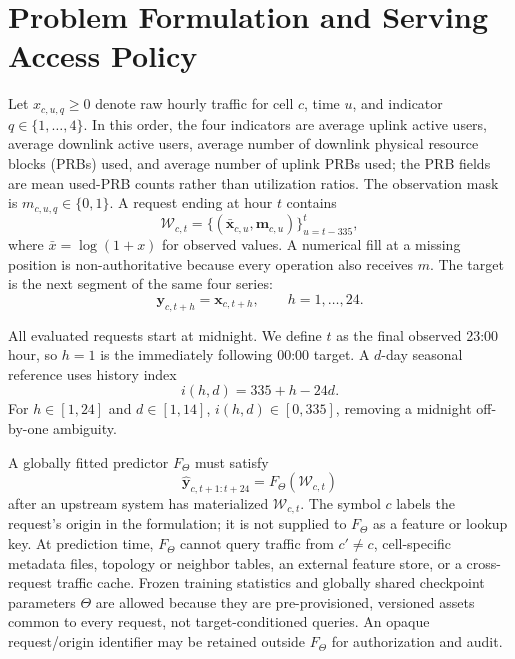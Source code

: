 \documentclass[10pt,conference,letterpaper]{IEEEtran}
\begin{document}
\section{Problem Formulation and Serving Access Policy}
Let $x_{c,u,q}\geq0$ denote raw hourly traffic for cell $c$, time $u$, and indicator $q\in\{1,\ldots,4\}$. In this order, the four indicators are average uplink active users, average downlink active users, average number of downlink physical resource blocks (PRBs) used, and average number of uplink PRBs used; the PRB fields are mean used-PRB counts rather than utilization ratios. The observation mask is $m_{c,u,q}\in\{0,1\}$. A request ending at hour $t$ contains
\begin{equation}
\mathcal W_{c,t}=\{(\bar{\mathbf x}_{c,u},\mathbf m_{c,u})\}_{u=t-335}^{t},
\end{equation}
where $\bar x=\log(1+x)$ for observed values. A numerical fill at a missing position is non-authoritative because every operation also receives $m$. The target is the next segment of the same four series:
\begin{equation}
\mathbf y_{c,t+h}=\mathbf x_{c,t+h},\qquad h=1,\ldots,24.
\end{equation}

All evaluated requests start at midnight. We define $t$ as the final observed 23:00 hour, so $h=1$ is the immediately following 00:00 target. A $d$-day seasonal reference uses history index
\begin{equation}
i(h,d)=335+h-24d.
\end{equation}
For $h\in[1,24]$ and $d\in[1,14]$, $i(h,d)\in[0,335]$, removing a midnight off-by-one ambiguity.

A globally fitted predictor $F_{\Theta}$ must satisfy
\begin{equation}
\widehat{\mathbf y}_{c,t+1:t+24}=F_{\Theta}(\mathcal W_{c,t})
\end{equation}
after an upstream system has materialized $\mathcal W_{c,t}$. The symbol $c$ labels the request's origin in the formulation; it is not supplied to $F_{\Theta}$ as a feature or lookup key. At prediction time, $F_{\Theta}$ cannot query traffic from $c'\neq c$, cell-specific metadata files, topology or neighbor tables, an external feature store, or a cross-request traffic cache. Frozen training statistics and globally shared checkpoint parameters $\Theta$ are allowed because they are pre-provisioned, versioned assets common to every request, not target-conditioned queries. An opaque request/origin identifier may be retained outside $F_{\Theta}$ for authorization and audit.
\end{document}
